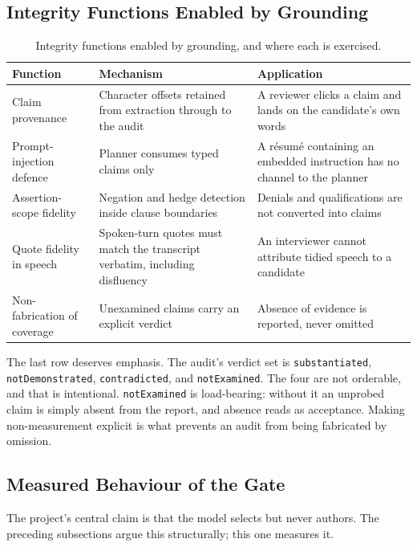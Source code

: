 \subsection{Integrity Functions Enabled by Grounding}

\begin{table}[t]
\caption{Integrity functions enabled by grounding, and where each is exercised.}
\label{tab:grounding-features}
\small
\begin{tabular}{@{}p{3.0cm}p{5.6cm}p{6.4cm}@{}}
\toprule
Function & Mechanism & Application \\
\midrule
Claim provenance & Character offsets retained from extraction through to the
audit & A reviewer clicks a claim and lands on the candidate's own words \\
Prompt-injection defence & Planner consumes typed claims only & A résumé
containing an embedded instruction has no channel to the planner \\
Assertion-scope fidelity & Negation and hedge detection inside clause boundaries
& Denials and qualifications are not converted into claims \\
Quote fidelity in speech & Spoken-turn quotes must match the transcript verbatim,
including disfluency & An interviewer cannot attribute tidied speech to a
candidate \\
Non-fabrication of coverage & Unexamined claims carry an explicit verdict &
Absence of evidence is reported, never omitted \\
\bottomrule
\end{tabular}
\end{table}

The last row deserves emphasis. The audit's verdict set is
\texttt{substantiated}, \texttt{notDemonstrated}, \texttt{contradicted}, and
\texttt{notExamined}. The four are not orderable, and that is intentional.
\texttt{notExamined} is load-bearing: without it an unprobed claim is simply
absent from the report, and absence reads as acceptance. Making non-measurement
explicit is what prevents an audit from being fabricated by omission.

\subsection{Measured Behaviour of the Gate}

The project's central claim is that the model selects but never authors. The
preceding subsections argue this structurally; this one measures it.

